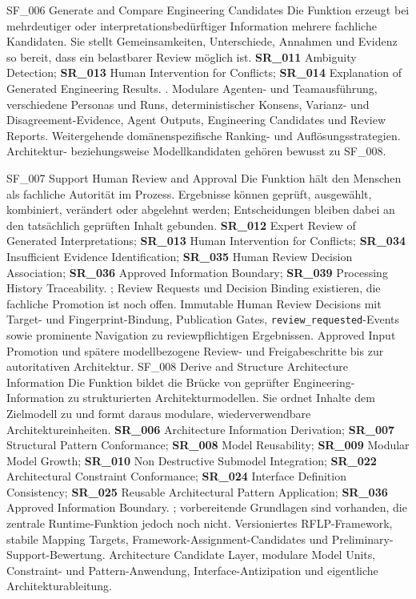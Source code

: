 \featureprofile
{SF\_006}
{Generate and Compare Engineering Candidates}
{Die Funktion erzeugt bei mehrdeutiger oder interpretationsbedürftiger
Information mehrere fachliche Kandidaten. Sie stellt Gemeinsamkeiten,
Unterschiede, Annahmen und Evidenz so bereit, dass ein belastbarer Review
möglich ist.}
{\textbf{SR\_011} Ambiguity Detection;
\textbf{SR\_013} Human Intervention for Conflicts;
\textbf{SR\_014} Explanation of Generated Engineering Results.}
{.}
{Modulare Agenten- und Teamausführung, verschiedene Personas und Runs,
deterministischer Konsens, Varianz- und Disagreement-Evidence, Agent Outputs,
Engineering Candidates und Review Reports.}
{Weitergehende domänenspezifische Ranking- und Auflösungsstrategien.
Architektur- beziehungsweise Modellkandidaten gehören bewusst zu SF\_008.}

\featureprofile
{SF\_007}
{Support Human Review and Approval}
{Die Funktion hält den Menschen als fachliche Autorität im Prozess. Ergebnisse
können geprüft, ausgewählt, kombiniert, verändert oder abgelehnt werden;
Entscheidungen bleiben dabei an den tatsächlich geprüften Inhalt gebunden.}
{\textbf{SR\_012} Expert Review of Generated Interpretations;
\textbf{SR\_013} Human Intervention for Conflicts;
\textbf{SR\_034} Insufficient Evidence Identification;
\textbf{SR\_035} Human Review Decision Association;
\textbf{SR\_036} Approved Information Boundary;
\textbf{SR\_039} Processing History Traceability.}
{; Review Requests und Decision Binding
existieren, die fachliche Promotion ist noch offen.}
{Immutable Human Review Decisions mit Target- und Fingerprint-Bindung,
Publication Gates, \texttt{review\_requested}-Events sowie prominente
Navigation zu reviewpflichtigen Ergebnissen.}
{Approved Input Promotion und spätere modellbezogene Review- und
Freigabeschritte bis zur autoritativen Architektur.}
\pagebreak
\featureprofile
{SF\_008}
{Derive and Structure Architecture Information}
{Die Funktion bildet die Brücke von geprüfter Engineering-Information zu
strukturierten Architekturmodellen. Sie ordnet Inhalte dem Zielmodell zu und
formt daraus modulare, wiederverwendbare Architektureinheiten.}
{\textbf{SR\_006} Architecture Information Derivation;
\textbf{SR\_007} Structural Pattern Conformance;
\textbf{SR\_008} Model Reusability;
\textbf{SR\_009} Modular Model Growth;
\textbf{SR\_010} Non Destructive Submodel Integration;
\textbf{SR\_022} Architectural Constraint Conformance;
\textbf{SR\_024} Interface Definition Consistency;
\textbf{SR\_025} Reusable Architectural Pattern Application;
\textbf{SR\_036} Approved Information Boundary.}
{; vorbereitende Grundlagen sind vorhanden,
die zentrale Runtime-Funktion jedoch noch nicht.}
{Versioniertes RFLP-Framework, stabile Mapping Targets,
Framework-Assignment-Candidates und Preliminary-Support-Bewertung.}
{Architecture Candidate Layer, modulare Model Units, Constraint- und
Pattern-Anwendung, Interface-Antizipation und eigentliche
Architekturableitung.}


